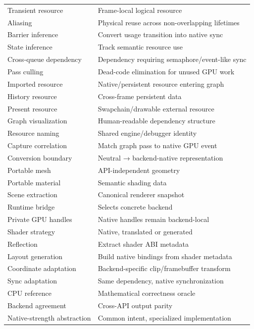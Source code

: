 {\begin{longtable}[]{@{}
  >{\raggedright\arraybackslash}p{}
  >{\raggedright\arraybackslash}p{}@{}}
Transient resource & Frame-local logical resource \\
Aliasing & Physical reuse across non-overlapping lifetimes \\
Barrier inference & Convert usage transition into native sync \\
State inference & Track semantic resource use \\
Cross-queue dependency & Dependency requiring semaphore/event-like sync \\
Pass culling & Dead-code elimination for unused GPU work \\
Imported resource & Native/persistent resource entering graph \\
History resource & Cross-frame persistent data \\
Present resource & Swapchain/drawable external resource \\
Graph visualization & Human-readable dependency structure \\
Resource naming & Shared engine/debugger identity \\
Capture correlation & Match graph pass to native GPU event \\
Conversion boundary & Neutral → backend-native representation \\
Portable mesh & API-independent geometry \\
Portable material & Semantic shading data \\
Scene extraction & Canonical renderer snapshot \\
Runtime bridge & Selects concrete backend \\
Private GPU handles & Native handles remain backend-local \\
Shader strategy & Native, translated or generated \\
Reflection & Extract shader ABI metadata \\
Layout generation & Build native bindings from shader metadata \\
Coordinate adaptation & Backend-specific clip/framebuffer transform \\
Sync adaptation & Same dependency, native synchronization \\
CPU reference & Mathematical correctness oracle \\
Backend agreement & Cross-API output parity \\
Native-strength abstraction & Common intent, specialized implementation \\
\end{longtable}
}

